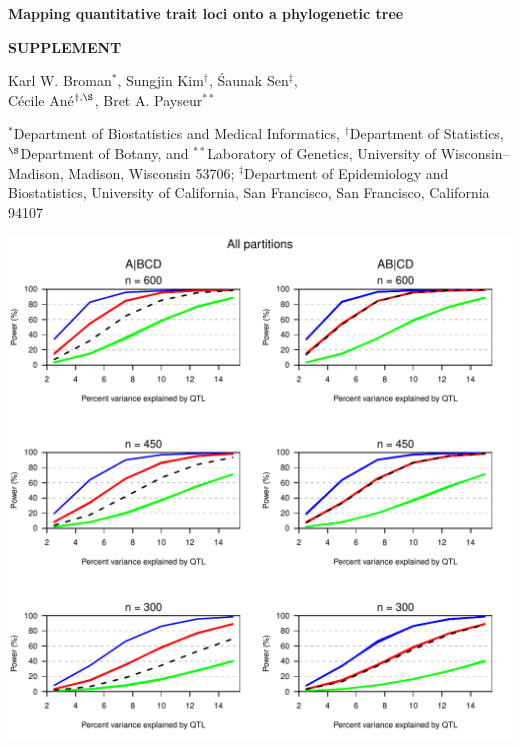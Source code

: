 \documentclass[letterpaper,twoside]{article}
\begin{document}
\vspace*{8mm}
\begin{center}

\textbf{\Large Mapping quantitative trait loci %
onto a phylogenetic tree}
 
 
\bigskip \bigskip \bigskip \bigskip 
 
\textbf{\Large SUPPLEMENT}

\bigskip \bigskip
\bigskip \bigskip
 
 
{\large Karl W. Broman$^{*}$, Sungjin Kim$^{\dagger}$, \'Saunak
  Sen$^\ddagger$,\\[6pt]
C\'ecile An\'e$^{\dagger,\S}$, Bret A. Payseur$^{**}$}

\bigskip \bigskip

$^*$Department of Biostatistics and Medical Informatics,
$^\dagger$Department of Statistics, $^{\S}$Department of Botany, and $^{**}$Laboratory of
Genetics, University of Wisconsin--Madison, Madison, Wisconsin
53706; $^\ddagger$Department of Epidemiology and Biostatistics, University
of California, San Francisco, San Francisco, California 94107
\end{center}


%

\newpage

{\centering
\includegraphics{SuppFigs/power_allpart.pdf}}
\end{document}
